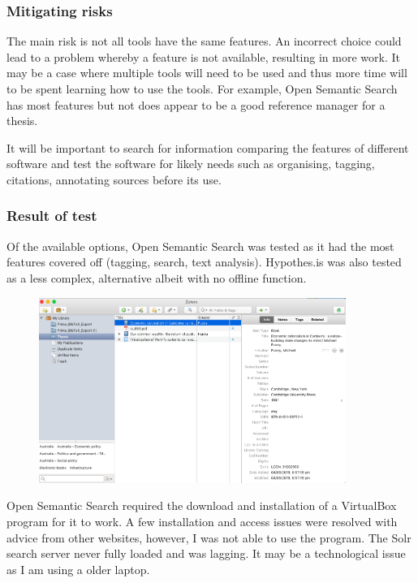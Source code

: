 \documentclass{article}
\begin{document}
\subsubsection*{Mitigating risks}

The main risk is not all tools have the same features. An incorrect choice could lead to a problem whereby a feature is not available, resulting in more work. It may be a case where multiple tools will need to be used and thus more time will to be spent learning how to use the tools. For example, Open Semantic Search has most features but not does appear to be a good reference manager for a thesis.\par 

It will be important to search for information comparing the features of different software and test the software for likely needs such as organising, tagging, citations, annotating sources before its use.\par

\subsubsection*{Result of test}

Of the available options, Open Semantic Search was tested as it had the most features covered off (tagging, search, text analysis). Hypothes.is was also tested as a less complex, alternative albeit with no offline function.

\begin{figure}[htp]
    \centering
    \includegraphics[width=10cm]{OpenSemantic.png}
    \label{fig:opensemantic}
\end{figure}

Open Semantic Search required the download and installation of a VirtualBox program for it to work. A few installation and access issues were resolved with advice from other websites, however, I was not able to use the program. The Solr search server never fully loaded and was lagging. It may be a technological issue as I am using a older laptop.
\end{document}
